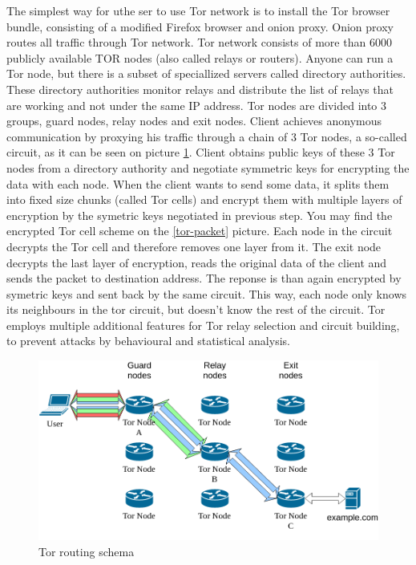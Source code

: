\documentclass[
  digital, %
  table,   %
  lof,     %
  lot,     %
  oneside
]{fithesis3}
\begin{document}
The simplest way for uthe ser to use Tor network is to install the Tor browser bundle, consisting of
a modified Firefox browser and onion proxy. Onion proxy routes all traffic through Tor network.
Tor network consists of more than 6000 publicly available TOR nodes (also called relays or routers).
Anyone can run a Tor node, but there is a subset of speciallized servers called directory authorities.
These directory authorities monitor relays and distribute the list of relays that are working and 
not under the same IP address.
Tor nodes are divided into 3 groups, guard nodes, relay nodes and exit nodes.
Client achieves anonymous communication by proxying his traffic through
a chain of 3 Tor nodes, a so-called circuit, as it can be seen on picture \ref{tor}.
Client obtains public keys of these 3 Tor nodes from a directory authority and negotiate
symmetric keys for encrypting the data with each node.
When the client wants to send some data, it splits them into fixed size chunks
(called Tor cells) and encrypt them with multiple layers of encryption by the symetric keys negotiated in previous step.
You may find the encrypted Tor cell scheme on the \ref{tor-packet} picture.
Each node in the circuit decrypts the Tor cell and therefore removes one layer from it.
The exit node decrypts the last layer of encryption, reads the original data of the client and 
sends the packet to destination address. The reponse is than again encrypted by symetric keys
and sent back by the same circuit.
This way, each node only knows its neighbours in the tor circuit, but doesn't know the rest of the circuit.
Tor employs multiple additional features for Tor relay selection and circuit building, to prevent attacks
by behavioural and statistical analysis.
 
\begin{figure}[!htb]
    \centering
    \includegraphics[width=1\textwidth]{tor}
    \caption{Tor routing schema}
    \label{tor}
\end{figure}
 
\end{document}
